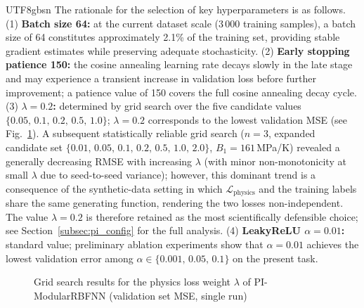 \documentclass[a4paper,12pt]{report}
\newcommand{\Lphys}{\mathcal{L}_{\text{physics}}}
\begin{document}
\begin{CJK}{UTF8}{gbsn}
The rationale for the selection of key hyperparameters is as follows. (1) \textbf{Batch
size 64:} at the current dataset scale (3\,000 training samples), a batch size of 64
constitutes approximately 2.1\% of the training set, providing stable gradient estimates
while preserving adequate stochasticity. (2) \textbf{Early stopping patience 150:} the
cosine annealing learning rate decays slowly in the late stage and may experience a
transient increase in validation loss before further improvement; a patience value of 150
covers the full cosine annealing decay cycle. (3) \textbf{$\lambda = 0.2$:} determined
by grid search over the five candidate values $\{0.05,\,0.1,\,0.2,\,0.5,\,1.0\}$;
$\lambda = 0.2$ corresponds to the lowest validation MSE (see Fig.~\ref{fig:lambda_search}).
A subsequent statistically reliable grid search ($n = 3$, expanded candidate set
$\{0.01,\,0.05,\,0.1,\,0.2,\,0.5,\,1.0,\,2.0\}$, $B_1 = 161$\,MPa/K) revealed a
generally decreasing RMSE with increasing $\lambda$ (with minor non-monotonicity at
small $\lambda$ due to seed-to-seed variance); however, this dominant trend is a
consequence of the synthetic-data setting in which $\Lphys$ and the training labels
share the same generating function, rendering the two losses non-independent. The value
$\lambda = 0.2$ is therefore retained as the most scientifically defensible choice;
see Section~\ref{subsec:pi_config} for the full analysis.
(4) \textbf{LeakyReLU $\alpha = 0.01$:} standard value; preliminary ablation experiments
show that $\alpha = 0.01$ achieves the lowest validation error among
$\alpha \in \{0.001,\,0.05,\,0.1\}$ on the present task.

\begin{figure}[H]
  \centering
  \caption{Grid search results for the physics loss weight $\lambda$ of PI-ModularRBFNN
    (validation set MSE, single run)}
  \label{fig:lambda_search}
\end{figure}


\end{CJK}
\end{document}
